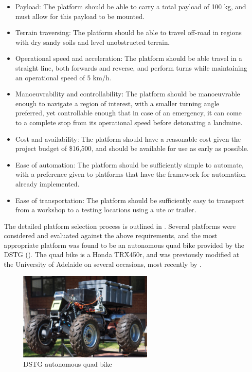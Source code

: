 \documentclass[main.tex]{subfiles}
\begin{document}
\begin{itemize}
 \item Payload: The platform should be able to carry a total payload of 100 kg, and must allow for this payload to be mounted.
 \item Terrain traversing: The platform should be able to travel off-road in regions with dry sandy soils and level unobstructed terrain.
\item  Operational speed and acceleration: The platform should be able travel in a straight line, both forwards and reverse, and perform turns while maintaining an operational speed of 5 km/h.
\item Manoeuvrability and controllability: The platform should be manoeuvrable enough to navigate a region of interest, with a smaller turning angle preferred, yet controllable enough that in case of an emergency, it can come to a complete stop from its operational speed before detonating a landmine.
\item Cost and availability: The platform should have a reasonable cost given the project budget of \$16,500, and should be available for use as early as possible. 
\item Ease of automation: The platform should be sufficiently simple to automate, with a preference given to platforms that have the framework for automation already implemented. 
\item Ease of transportation: The platform should be sufficiently easy to transport from a workshop to a testing locations using a ute or trailer.
\end{itemize}

The detailed platform selection process is outlined in . Several platforms were considered and evaluated against the above requirements, and the most appropriate platform was found to be an autonomous quad bike provided by the DSTG (). The quad bike is a Honda TRX450r, and was previously modified at the University of Adelaide on several occasions, most recently by \textcite{scheiner2011}. 

\begin{figure}[ht]
\includegraphics[width=0.6\textwidth]{3-ConceptDesign/bike.JPG}
\centering
\caption{DSTG autonomous quad bike} 
\end{figure}
\end{document}
